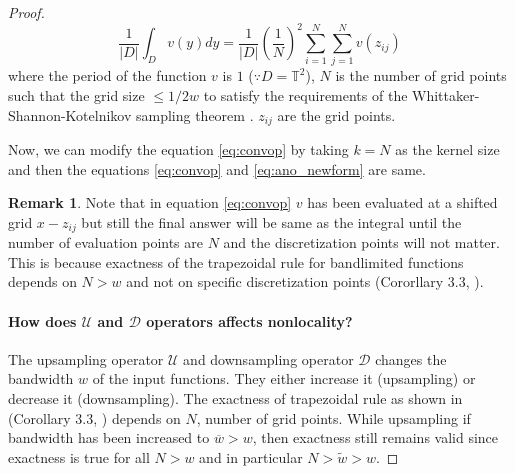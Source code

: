 \documentclass[reqno,10pt]{amsart}
\theoremstyle{plain}
\theoremstyle{definition}
\newtheorem{rem}{Remark}
\newcommand{\bb}[1]{\mathbb{#1}}
\newcommand{\cal}[1]{\mathcal{#1}}
\begin{document}
\begin{proof}
        \begin{equation}\label{eq:ano_newform}
            \frac{1}{|D|} \int_D v(y) dy = \frac{1}{|D|}\left(\frac{1}{N}\right)^2 \sum_{i=1}^{N} \sum_{j=1}^{N} v(z_{ij})
        \end{equation}
        where the period of the function $v$ is $1$ ($\because D =\bb T^2$), $N$ is the number of grid points such that the grid size $\leq 1/2w$ to satisfy the requirements of the Whittaker-Shannon-Kotelnikov sampling theorem \cite{MU2000}. $z_{ij}$ are the grid points.

        \noindent Now, we can modify the equation \ref{eq:convop} by taking $k=N$ as the kernel size and then the equations \ref{eq:convop} and \ref{eq:ano_newform} are same.
        
        \begin{rem}
            Note that in equation \ref{eq:convop} $v$ has been evaluated at a shifted grid $x-z_{ij}$ but still the final answer will be same as the integral until the number of evaluation points are $N$ and the discretization points will not matter. This is because exactness of the trapezoidal rule for bandlimited functions depends on $N >w$ and not on specific discretization points (Cororllary 3.3, \cite{LT2014}).
        \end{rem}
        \paragraph{\bf How does $\cal U$ and $\cal D$ operators affects nonlocality?} \label{par:1} The upsampling operator $\cal U$ and downsampling operator $\cal D$ changes the bandwidth $w$ of the input functions. They either increase it (upsampling) or decrease it (downsampling). The exactness of trapezoidal rule as shown in (Corollary 3.3, \cite{LT2014}) depends on $N$, number of grid points. While upsampling if bandwidth has been increased to $\overline{w} > w$, then exactness still remains valid since exactness is true for all $N > w$ and in particular $N > \tilde{w} > w$.


\end{proof}
\end{document}
